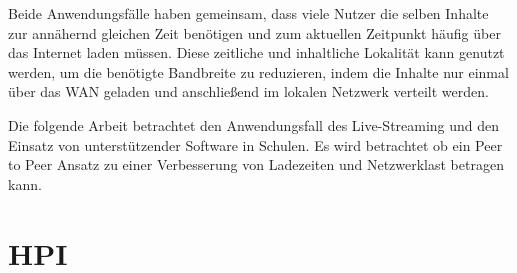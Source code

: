Beide Anwendungsfälle haben gemeinsam, dass viele Nutzer die selben Inhalte zur annähernd gleichen Zeit benötigen und zum aktuellen Zeitpunkt häufig über das Internet laden müssen. Diese zeitliche und inhaltliche Lokalität kann genutzt werden, um die benötigte Bandbreite zu reduzieren, indem die Inhalte nur einmal über das WAN geladen und anschließend im lokalen Netzwerk verteilt werden.

Die folgende Arbeit betrachtet den Anwendungsfall des Live-Streaming und den Einsatz von unterstützender Software in Schulen. Es wird betrachtet ob ein Peer to Peer Ansatz zu einer Verbesserung von Ladezeiten und Netzwerklast betragen kann.
 




\section{HPI \schulCloud}

